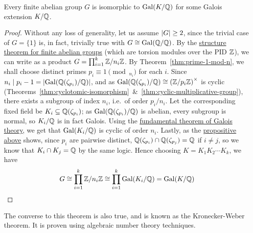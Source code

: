 \begin{theorem}
    Every finite abelian group \(G\) is isomorphic to \(\operatorname{Gal}(K/\mathbb{Q})\)
    for some Galois extension \(K/\mathbb{Q}\).
\end{theorem}
\begin{proof}
    Without any loss of generality, let us assume \(\abs{G} \geq 2\),
    since the trivial case of \(G = \{1\}\) is, in fact, trivially true with \(G \cong \operatorname{Gal}(\mathbb{Q}/\mathbb{Q})\).
    By the \hyperref[thm:structure-invariant]{structure theorem for finite abelian groups}
    (which are torsion modules over the PID \(\mathbb{Z}\)),
    we can write as a product \(G = \prod_{i=1}^k \mathbb{Z}/n_i\mathbb{Z}\).
    By Theorem~\ref{thm:prime-1-mod-n},
    we shall choose distinct primes \(p_i \equiv 1 \pmod_{n_i}\) for each \(i\).
    Since \(n_i \mid p_i - 1 = \abs{\operatorname{Gal}(\mathbb{Q}(\zeta_{p_i})/\mathbb{Q})}\),
    and as \(\operatorname{Gal}(\mathbb{Q}(\zeta_{p_i})/\mathbb{Q}) \cong {(\mathbb{Z}/p_i\mathbb{Z})}^\times\) is cyclic
    (Theorems~\ref{thm:cyclotomic-isomorphism}~\&~\ref{thm:cyclic-multiplicative-group}),
    there exists a subgroup of index \(n_i\), i.e.\ of order \(p_i/n_i\).
    Let the corresponding fixed field be \(K_i \subseteq \mathbb{Q}(\zeta_{p_i})\);
    as \(\operatorname{Gal}(\mathbb{Q}(\zeta_{p_i})/\mathbb{Q})\) is abelian, every subgroup is normal,
    so \(K_i/\mathbb{Q}\) is in fact Galois.
    Using the \hyperref[thm:ftgt]{fundamental theorem of Galois theory},
    we get that \(\operatorname{Gal}(K_i/\mathbb{Q})\) is cyclic of order \(n_i\).
    Lastly, as the \hyperref[prop:coprime-compositum]{propositive above} shows,
    since \(p_i\) are pairwise distinct, \(\mathbb{Q}(\zeta_{p_i}) \cap \mathbb{Q}(\zeta_{p_j}) = \mathbb{Q}\) if \(i \neq j\),
    so we know that \(K_i \cap K_j = \mathbb{Q}\) by the same logic.
    Hence choosing \(K = K_1 K_2 \cdots K_k\), we have
    \begin{equation*}
        G \cong \prod_{i=1}^k \mathbb{Z}/n_i\mathbb{Z} \cong \prod_{i=1}^k \operatorname{Gal}(K_i/\mathbb{Q}) = \operatorname{Gal}(K/\mathbb{Q})
    \end{equation*}
\end{proof}
\begin{remark}
    The converse to this theorem is also true, and is known as the Kronecker-Weber theorem.
    It is proven using algebraic number theory techniques.
\end{remark}


